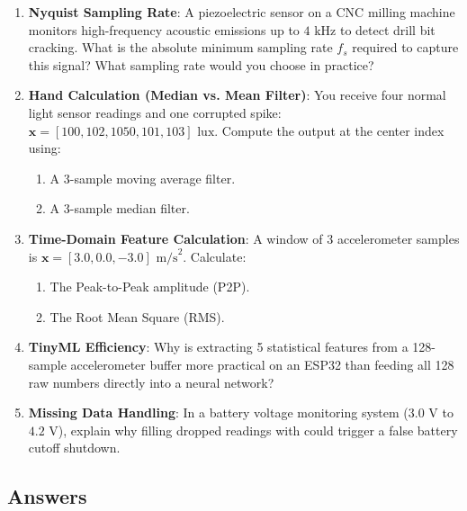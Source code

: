 \begin{enumerate}
    \item \textbf{Nyquist Sampling Rate}: A piezoelectric sensor on a CNC milling machine monitors high-frequency acoustic emissions up to $4\text{ kHz}$ to detect drill bit cracking. What is the absolute minimum sampling rate $f_s$ required to capture this signal? What sampling rate would you choose in practice?

    \item \textbf{Hand Calculation (Median vs. Mean Filter)}: You receive four normal light sensor readings and one corrupted spike: $\mathbf{x} = [100, 102, 1050, 101, 103]\text{ lux}$. Compute the output at the center index using:
    \begin{enumerate}
        \item A 3-sample moving average filter.
        \item A 3-sample median filter.
    \end{enumerate}

    \item \textbf{Time-Domain Feature Calculation}: A window of 3 accelerometer samples is $\mathbf{x} = [3.0, 0.0, -3.0]\text{ m/s}^2$. Calculate:
    \begin{enumerate}
        \item The Peak-to-Peak amplitude (P2P).
        \item The Root Mean Square (RMS).
    \end{enumerate}

    \item \textbf{TinyML Efficiency}: Why is extracting 5 statistical features from a 128-sample accelerometer buffer more practical on an ESP32 than feeding all 128 raw numbers directly into a neural network?

    \item \textbf{Missing Data Handling}: In a battery voltage monitoring system ($3.0\text{ V}$ to $4.2\text{ V}$), explain why filling dropped readings with  could trigger a false battery cutoff shutdown.
\end{enumerate}

\subsection*{Answers}

